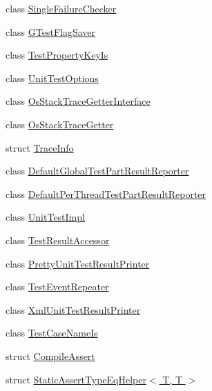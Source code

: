 \begin{DoxyCompactItemize}
\item 
class \hyperlink{classtesting_1_1internal_1_1SingleFailureChecker}{\-Single\-Failure\-Checker}
\item 
class \hyperlink{classtesting_1_1internal_1_1GTestFlagSaver}{\-G\-Test\-Flag\-Saver}
\item 
class \hyperlink{classtesting_1_1internal_1_1TestPropertyKeyIs}{\-Test\-Property\-Key\-Is}
\item 
class \hyperlink{classtesting_1_1internal_1_1UnitTestOptions}{\-Unit\-Test\-Options}
\item 
class \hyperlink{classtesting_1_1internal_1_1OsStackTraceGetterInterface}{\-Os\-Stack\-Trace\-Getter\-Interface}
\item 
class \hyperlink{classtesting_1_1internal_1_1OsStackTraceGetter}{\-Os\-Stack\-Trace\-Getter}
\item 
struct \hyperlink{structtesting_1_1internal_1_1TraceInfo}{\-Trace\-Info}
\item 
class \hyperlink{classtesting_1_1internal_1_1DefaultGlobalTestPartResultReporter}{\-Default\-Global\-Test\-Part\-Result\-Reporter}
\item 
class \hyperlink{classtesting_1_1internal_1_1DefaultPerThreadTestPartResultReporter}{\-Default\-Per\-Thread\-Test\-Part\-Result\-Reporter}
\item 
class \hyperlink{classtesting_1_1internal_1_1UnitTestImpl}{\-Unit\-Test\-Impl}
\item 
class \hyperlink{classtesting_1_1internal_1_1TestResultAccessor}{\-Test\-Result\-Accessor}
\item 
class \hyperlink{classtesting_1_1internal_1_1PrettyUnitTestResultPrinter}{\-Pretty\-Unit\-Test\-Result\-Printer}
\item 
class \hyperlink{classtesting_1_1internal_1_1TestEventRepeater}{\-Test\-Event\-Repeater}
\item 
class \hyperlink{classtesting_1_1internal_1_1XmlUnitTestResultPrinter}{\-Xml\-Unit\-Test\-Result\-Printer}
\item 
class \hyperlink{classtesting_1_1internal_1_1TestCaseNameIs}{\-Test\-Case\-Name\-Is}
\item 
struct \hyperlink{structtesting_1_1internal_1_1CompileAssert}{\-Compile\-Assert}
\item 
struct \hyperlink{structtesting_1_1internal_1_1StaticAssertTypeEqHelper_3_01T_00_01T_01_4}{\-Static\-Assert\-Type\-Eq\-Helper$<$ T, T $>$}
\item 

\end{DoxyCompactItemize}
